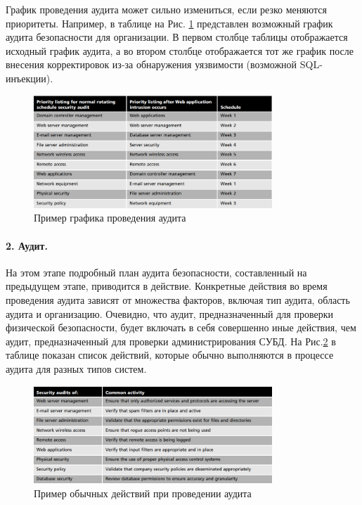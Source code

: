 График проведения аудита может сильно измениться, если резко меняются приоритеты. Например, в таблице на Рис. \ref{fig:Schedule_audit} представлен возможный график аудита безопасности для организации. В первом столбце таблицы отображается исходный график аудита, а во втором столбце отображается тот же график после внесения корректировок из-за обнаружения уязвимости (возможной SQL-инъекции).

\begin{figure}[h!]
    \centering
    \includegraphics[width=0.8\textwidth]{assets/Schedule_audit}
    \caption{Пример графика проведения аудита}
	\label{fig:Schedule_audit}
\end{figure}

\paragraph{2. Аудит.}

На этом этапе подробный план аудита безопасности, составленный на предыдущем этапе, приводится в действие. Конкретные действия во время проведения аудита зависят от множества факторов, включая тип аудита, область аудита и организацию. Очевидно, что аудит, предназначенный для проверки физической безопасности, будет включать в себя совершенно иные действия, чем аудит, предназначенный для проверки администрирования СУБД. На Рис.\ref{fig:Common_actions_audit} в таблице показан список действий, которые обычно выполняются в процессе аудита для разных типов систем.

\begin{figure}[h!]
    \centering
    \includegraphics[width=0.8\textwidth]{assets/Common_actions_audit}
    \caption{Пример обычных действий при проведении аудита}
	\label{fig:Common_actions_audit}
\end{figure}

